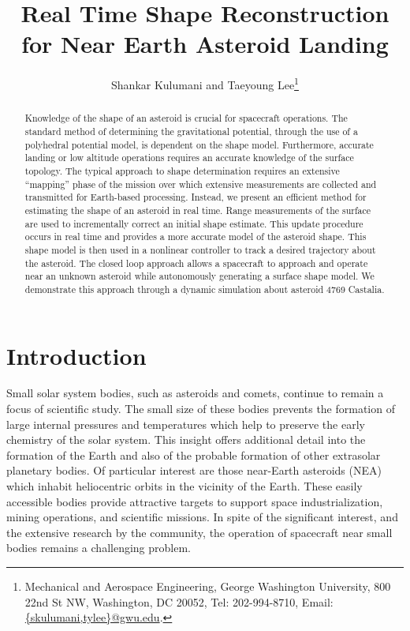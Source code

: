 \documentclass[letterpaper, paper,11pt]{AAS}		%
\begin{document}
\title{Real Time Shape Reconstruction for Near Earth Asteroid Landing}

\author{Shankar Kulumani and Taeyoung Lee\thanks{Mechanical and Aerospace Engineering, George Washington University, 800 22nd St NW, Washington, DC 20052, Tel: 202-994-8710, Email: \href{mailto:skulumani@gwu.edu}{\{skulumani,tylee\}@gwu.edu}.}
}


\maketitle{} 		

\begin{abstract}
    Knowledge of the shape of an asteroid is crucial for spacecraft operations.
    The standard method of determining the gravitational potential, through the use of a polyhedral potential model, is dependent on the shape model.
    Furthermore, accurate landing or low altitude operations requires an accurate knowledge of the surface topology. 
    The typical approach to shape determination requires an extensive ``mapping'' phase of the mission over which extensive measurements are collected and transmitted for Earth-based processing.
    Instead, we present an efficient method for estimating the shape of an asteroid in real time.
    Range measurements of the surface are used to incrementally correct an initial shape estimate.
    This update procedure occurs in real time and provides a more accurate model of the asteroid shape.
    This shape model is then used in a nonlinear controller to track a desired trajectory about the asteroid.
    The closed loop approach allows a spacecraft to approach and operate near an unknown asteroid while autonomously generating a surface shape model.
    We demonstrate this approach through a dynamic simulation about asteroid 4769 Castalia.

\end{abstract}

\section{Introduction}\label{sec:introduction}
Small solar system bodies, such as asteroids and comets, continue to remain a focus of scientific study.
The small size of these bodies prevents the formation of large internal pressures and temperatures which help to preserve the early chemistry of the solar system.
This insight offers additional detail into the formation of the Earth and also of the probable formation of other extrasolar planetary bodies.
Of particular interest are those near-Earth asteroids (NEA) which inhabit heliocentric orbits in the vicinity of the Earth. 
These easily accessible bodies provide attractive targets to support space industrialization, mining operations, and scientific missions.
In spite of the significant interest, and the extensive research by the community, the operation of spacecraft near small bodies remains a challenging problem.
\end{document}
